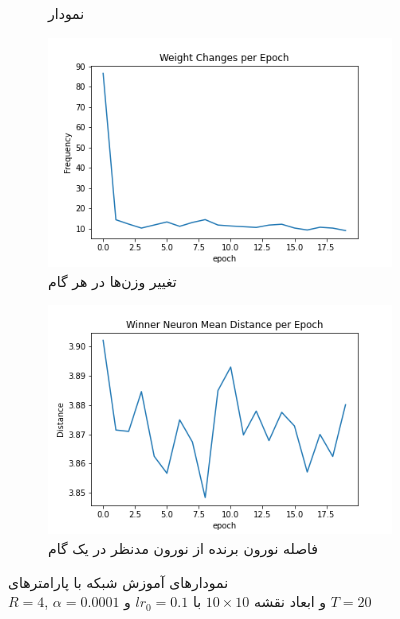 \documentclass[12pt, a4paper]{article}
\begin{document}
\begin{figure}[h]
\begin{subfigure}{0.45\linewidth}
        \caption{نمودار }
    \end{subfigure}
    \newline
    \begin{subfigure}{0.45\linewidth}
        \includegraphics[width=\linewidth]{images/q5/r11/weight_change.png}
        \caption{تغییر وزن‌ها در هر گام}
    \end{subfigure}
    \hfill
    \begin{subfigure}{0.45\linewidth}
        \includegraphics[width=\linewidth]{images/q5/r11/winner_distance.png}
        \caption{فاصله نورون برنده از نورون مدنظر در یک گام}
    \end{subfigure}
    \caption{نمودار‌های آموزش شبکه  با پارامتر‌های \\$R=4$, $\alpha=0.0001$ و ابعاد نقشه $10 \times 10$ با $lr_0=0.1$ و $T=20$}
    \label{r11}
\end{figure}
\end{document}
